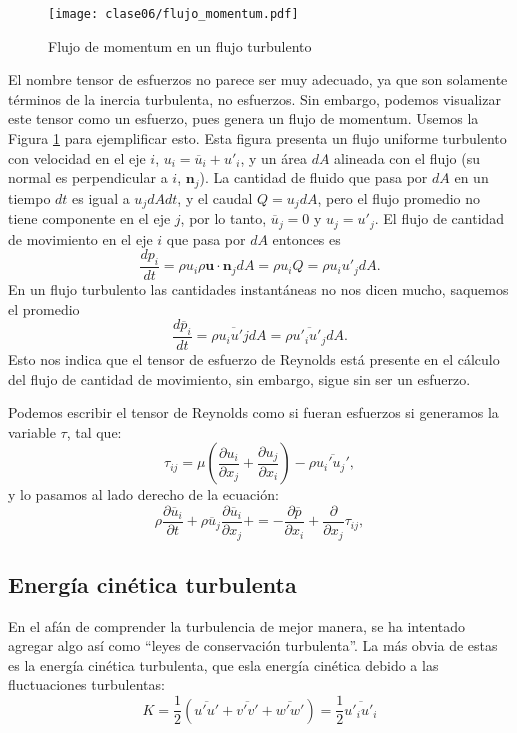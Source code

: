 \begin{figure}[h!]
\centering
\texttt{[image: clase06/flujo\_momentum.pdf]}
\caption{Flujo de momentum en un flujo turbulento}
\label{fig:flujo_momentum}
\end{figure}
%
El nombre tensor de esfuerzos no parece ser muy adecuado, ya que son solamente términos de la inercia turbulenta, no esfuerzos.
Sin embargo, podemos visualizar este tensor como un esfuerzo, pues genera un flujo de momentum.
Usemos la Figura \ref{fig:flujo_momentum} para ejemplificar esto.
Esta figura presenta un flujo uniforme turbulento con velocidad en el eje $i$, $u_i = \overline{u}_i + u'_i$, y un área $dA$ alineada con el flujo (su normal es perpendicular a $i$, $\mathbf{n}_j$).
La cantidad de fluido que pasa por $dA$ en un tiempo $dt$ es igual a $u_jdAdt$, y el caudal $Q=u_jdA$, pero el flujo promedio no tiene componente en el eje $j$, por lo tanto, $\overline{u}_j=0$ y $u_j = u'_j$.
El flujo de cantidad de movimiento en el eje $i$ que pasa por $dA$ entonces es 
%
\begin{equation}
\frac{dp_i}{dt} = \rho u_i \rho \mathbf{u}\cdot\mathbf{n}_j dA = \rho u_i Q = \rho u_i u'_j dA.
\end{equation}
%
En un flujo turbulento las cantidades instantáneas no nos dicen mucho, saquemos el promedio
%
\begin{equation}
\frac{d\overline{p}_i}{dt} = \rho \overline{u_i u'j} dA = \rho \overline{u'_iu'_j}dA.
\end{equation}
%
Esto nos indica que el tensor de esfuerzo de Reynolds está presente en el cálculo del flujo de cantidad de movimiento, sin embargo, sigue sin ser un esfuerzo.

Podemos escribir el tensor de Reynolds como si fueran esfuerzos si generamos la variable $\tau$, tal que:
%
\begin{equation}
\tau_{ij} = \mu\left(\frac{\partial u_i}{\partial x_j} + \frac{\partial u_j}{\partial x_i}\right) - \rho \overline{u_i'u_j'},
\end{equation}
%
y lo pasamos al lado derecho de la ecuación:
%
\begin{equation}\label{eq:tensor}
\rho\frac{\partial \overline{u}_i}{\partial t} + \rho\overline{u}_j\frac{\partial \overline{u}_i}{\partial x_j} +  = -\frac{\partial \overline{p}}{\partial x_i} + \frac{\partial}{\partial x_j}\tau_{ij},
\end{equation}



\subsection*{Energía cinética turbulenta}
En el afán de comprender la turbulencia de mejor manera, se ha intentado agregar algo así como ``leyes de conservación turbulenta''.
La más obvia de estas es la energía cinética turbulenta, que esla energía cinética debido a las fluctuaciones turbulentas:
%
\begin{equation}
K = \frac{1}{2}\left( \overline{u'u'}+\overline{v'v'}+\overline{w'w'}\right)=\frac{1}{2}\overline{u'_iu'_i}
\end{equation}

